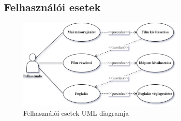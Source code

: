 \documentclass{article}
\begin{document}
	\subsection*{Felhasználói esetek}
	\begin{figure}[H]
		\centering
		\includegraphics[width=0.75\textwidth]{usercase}
		\caption{Felhasználói esetek UML diagramja}
	\end{figure}
\end{document}
